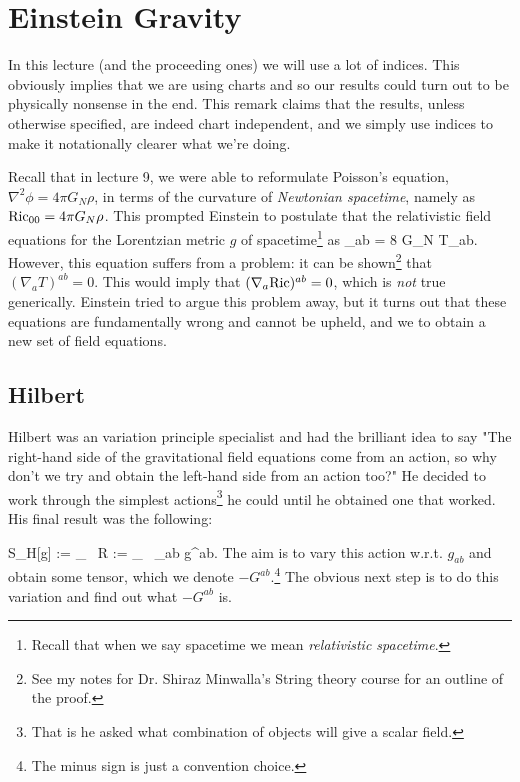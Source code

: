 \chapter{Einstein Gravity}

\br 
    In this lecture (and the proceeding ones) we will use a lot of indices. This obviously implies that we are using charts and so our results could turn out to be physically nonsense in the end. This remark claims that the results, unless otherwise specified, are indeed chart independent, and we simply use indices to make it notationally clearer what we're doing. 
\er 

Recall that in lecture 9, we were able to reformulate Poisson's equation, $\nabla^2\phi = 4\pi G_N \rho$, in terms of the curvature of \textit{Newtonian spacetime}, namely as $\text{Ric}_{00}=4\pi G_N\rho$. This prompted Einstein to postulate that the relativistic field equations for the Lorentzian metric $g$ of spacetime\footnote{Recall that when we say spacetime we mean \textit{relativistic spacetime}.} as 
\bse 
    \Ric_{ab} = 8 \pi G_N T_{ab}.
\ese 
However, this equation suffers from a problem: it can be shown\footnote{See my notes for Dr. Shiraz Minwalla's String theory course for an outline of the proof.} that $(\nabla_aT)^{ab}=0$. This would imply that $(\nabla_a\text{Ric})^{ab}=0$, which is \textit{not} true generically. Einstein tried to argue this problem away, but it turns out that these equations are fundamentally wrong and cannot be upheld, and we to obtain a new set of field equations. 

\section{Hilbert}

Hilbert was an variation principle specialist and had the brilliant idea to say "The right-hand side of the gravitational field equations come from an action, so why don't we try and obtain the left-hand side from an action too?" He decided to work through the simplest actions\footnote{That is he asked what combination of objects will give a scalar field.} he could until he obtained one that worked. His final result was the following:

\bse 
    S_H[g] := \int_{\cM}  \, R := \int_{\cM}  \, \Ric_{ab} g^{ab}.
\ese 
The aim is to vary this action w.r.t. $g_{ab}$ and obtain some tensor, which we denote $-G^{ab}$.\footnote{The minus sign is just a convention choice.} The obvious next step is to do this variation and find out what $-G^{ab}$ is. 

